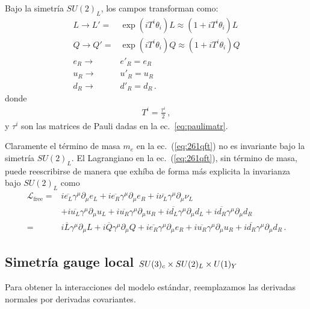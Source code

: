 \begin{frame}
Bajo la simetría $SU(2)_L$, los campos transforman como:
 \begin{align}
  L\to L'=&\exp(i T^i \theta_i)L\approx(1+i T^i\theta_i)L\nonumber\\
  Q\to Q'=&\exp(i T^i \theta_i)Q\approx(1+i T^i\theta_i)Q\nonumber\\
  e_R\to& e'_R=e_R\nonumber\\
  u_R\to& u'_R=u_R\nonumber\\
  d_R\to& d'_R=d_R\,.
\end{align}
donde
\begin{align}
  T^i=\frac{\tau^i}{2}\,,
\end{align}
y $\tau^i$ son las matrices de Pauli dadas en la ec.~\eqref{eq:paulimatr}.

Claramente el término de masa $m_e$ en la ec.~(\ref{eq:261qft}) no es invariante bajo la simetría $SU(2)_L$. El Lagrangiano en la ec.~(\ref{eq:261qft}), sin término de masa, puede reescribirse de manera que exhíba de forma más explicita la invarianza bajo $SU(2)_L$ como
\begin{align}
  \mathcal{L}_{\text{free}}
=&i\overline{e_L}\gamma^\mu\partial_\mu e_L+i\overline{e_R}\gamma^\mu\partial_\mu e_R+i\overline{\nu_L}\gamma^\mu\partial_\mu\nu_L\nonumber\\
&+i\overline{u_L}\gamma^\mu\partial_\mu u_L+i\overline{u_R}\gamma^\mu\partial_\mu u_R
+i\overline{d_L}\gamma^\mu\partial_\mu d_L+i\overline{d_R}\gamma^\mu\partial_\mu d_R\nonumber\\
=&i\overline{L}\gamma^\mu\partial_\mu L+i\overline{Q}\gamma^\mu\partial_\mu Q+i\overline{e_R}\gamma^\mu\partial_\mu e_R
+i\overline{u_R}\gamma^\mu\partial_\mu u_R
+i\overline{d_R}\gamma^\mu\partial_\mu d_R\,.
\end{align}


\subsection*{Simetría gauge local $SU(3)_c\times  SU(2)_L\times  U(1)_Y$}

Para obtener la interacciones del modelo estándar, reemplazamos las derivadas normales por derivadas covariantes.


\end{frame}
